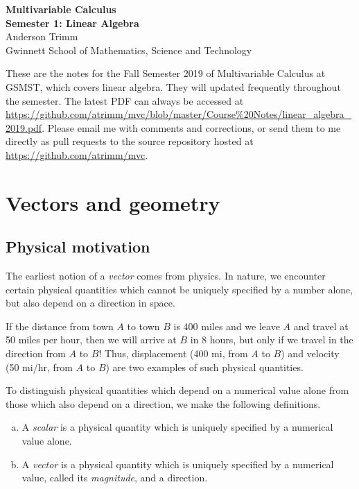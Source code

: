 \documentclass[12pt,letterpaper,reqno]{article}
\numberwithin{equation}{section}
\newcommand{\ti}[1]{\textit{#1}}
\newcommand{\tb}[1]{\textbf{#1}}
\begin{document}
\pagestyle{fancy}
\lhead{{\tiny \color{gray} \tt \gitAuthorIsoDate}}
\chead{\tiny \ti{Linear Algebra, GSMST 2018-2019}}
\rhead{{\tiny \color{gray} \tt \gitAbbrevHash}}
\renewcommand{\headrulewidth}{0.5pt}


\begin{center}
\tb{Multivariable Calculus \\
Semester 1: Linear Algebra} \\
Anderson Trimm \\
Gwinnett School of Mathematics, Science and Technology \\
\end{center}

{These are the notes for the Fall Semester 2019
of Multivariable Calculus at GSMST, which covers linear algebra. They will updated frequently throughout the semester. The latest PDF can always be accessed
at \small \url{https://github.com/atrimm/mvc/blob/master/Course%20Notes/linear_algebra_2019.pdf}.} Please email me with comments and corrections, or send them to me directly as pull requests to the source repository hosted at \small \url{https://github.com/atrimm/mvc}.

\tableofcontents
\renewcommand{\listtheoremname}{Quick reference}
\listoftheorems[onlynamed]

\newpage

\section{Vectors and geometry}
\subsection{Physical motivation}
The earliest notion of a \emph{vector} comes from physics. In nature, we encounter certain physical quantities which cannot be uniquely specified by a number alone, but also depend on a direction in space. 

\begin{example}\label{ex:disp}
If the distance from town $A$ to town $B$ is 400 miles and we leave $A$ and travel at 50 miles per hour, then we will arrive at $B$ in 8 hours, but only if we travel in the direction from $A$ to $B$! Thus, displacement (400 mi, from $A$ to $B$) and velocity (50 mi/hr, from $A$ to $B$) are two examples of such physical quantities.
\end{example}
To distinguish physical quantities which depend on a numerical value alone from those which also depend on a direction, we make the following definitions. 
\begin{defn}
\begin{enumerate}[(a)] \hspace{10cm}
	\item A \emph{scalar} is a physical quantity which is uniquely specified by a numerical value alone.
	\item A \emph{vector} is a physical quantity which is uniquely specified by a numerical value, called its \emph{magnitude}, and a direction.
\end{enumerate}
\end{defn}
\end{document}
